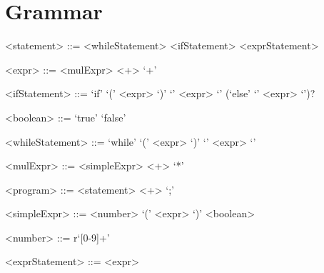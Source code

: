 \documentclass[10pt,letterpaper]{article}
\begin{document}
\section{Grammar}

\begin{grammar}
<statement> ::= <whileStatement>
    \alt <ifStatement>
    \alt <exprStatement>
  
  <expr> ::= <mulExpr> <+> `+'
  
  <ifStatement> ::= `if' `(' <expr> `)' `{' <expr> `}' (`else' `{' <expr> `}')?
  
  <boolean> ::= `true'
    \alt `false'
  
  <whileStatement> ::= `while' `(' <expr> `)' `{' <expr> `}'
  
  <mulExpr> ::= <simpleExpr> <+> `*'
  
  <program> ::= <statement> <+> `;'
  
  <simpleExpr> ::= <number>
    \alt `(' <expr> `)'
    \alt <boolean>
  
  <number> ::= r`[0-9]+'
  
  <exprStatement> ::= <expr>
\end{grammar}
\end{document}
